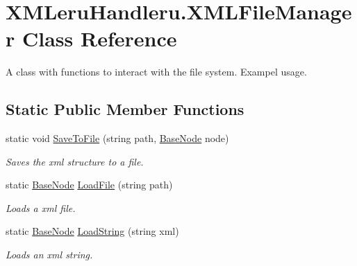 \hypertarget{class_x_m_leru_handleru_1_1_x_m_l_file_manager}{}\section{X\+M\+Leru\+Handleru.\+X\+M\+L\+File\+Manager Class Reference}
\label{class_x_m_leru_handleru_1_1_x_m_l_file_manager}


A class with functions to interact with the file system. Exampel usage.  


\subsection*{Static Public Member Functions}
\begin{DoxyCompactItemize}
\item 
static void \hyperlink{class_x_m_leru_handleru_1_1_x_m_l_file_manager_af518835562c9dc0e93f2f737923a0935}{Save\+To\+File} (string path, \hyperlink{class_x_m_leru_handleru_1_1_base_node}{Base\+Node} node)
\begin{DoxyCompactList}\small\item\em Saves the xml structure to a file. \end{DoxyCompactList}\item 
static \hyperlink{class_x_m_leru_handleru_1_1_base_node}{Base\+Node} \hyperlink{class_x_m_leru_handleru_1_1_x_m_l_file_manager_a2e3dfed69563014bb11b61699ce76799}{Load\+File} (string path)
\begin{DoxyCompactList}\small\item\em Loads a xml file. \end{DoxyCompactList}\item 
static \hyperlink{class_x_m_leru_handleru_1_1_base_node}{Base\+Node} \hyperlink{class_x_m_leru_handleru_1_1_x_m_l_file_manager_af04699e6a4e0195b2e408e52aab1eaee}{Load\+String} (string xml)
\begin{DoxyCompactList}\small\item\em Loads an xml string. \end{DoxyCompactList}\end{DoxyCompactItemize}
